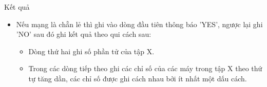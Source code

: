 Kết quả
\begin{itemize}
	\item     Nếu mạng là    chẵn lẻ    thì ghi vào dòng đầu tiên thông báo 'YES', ngược lại ghi 'NO' sau đó ghi kết quả theo qui cách sau:    
\begin{itemize}
	\item       Dòng thứ hai ghi số phần tử của tập X.     
	\item       Trong các dòng tiếp theo ghi các chỉ số của các máy trong tập X theo thứ tự tăng dần, các chỉ số được ghi cách nhau bởi ít nhất một dấu cách.     
\end{itemize}
\end{itemize}